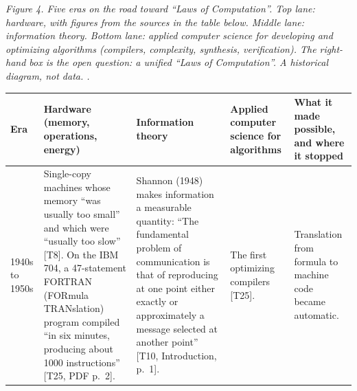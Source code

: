 \documentclass[10pt,letterpaper]{article}
\begin{document}
\emph{Figure 4. Five eras on the road toward ``Laws of Computation''.
Top lane: hardware, with figures from the sources in the table below.
Middle lane: information theory. Bottom lane: applied computer science
for developing and optimizing algorithms (compilers, complexity,
synthesis, verification). The right-hand box is the open question: a
unified ``Laws of Computation''. A historical diagram, not data. .}

{\footnotesize\setlength{\tabcolsep}{3.8pt}\renewcommand{\arraystretch}{1.15}
\begin{longtable}[]{@{}
  >{\raggedright\arraybackslash}p{}
  >{\raggedright\arraybackslash}p{}
  >{\raggedright\arraybackslash}p{}
  >{\raggedright\arraybackslash}p{}
  >{\raggedright\arraybackslash}p{}@{}}
\toprule\noalign{}
\begin{minipage}[b]{\linewidth}\raggedright
\textbf{Era}
\end{minipage} & \begin{minipage}[b]{\linewidth}\raggedright
\textbf{Hardware (memory, operations, energy)}
\end{minipage} & \begin{minipage}[b]{\linewidth}\raggedright
\textbf{Information theory}
\end{minipage} & \begin{minipage}[b]{\linewidth}\raggedright
\textbf{Applied computer science for algorithms}
\end{minipage} & \begin{minipage}[b]{\linewidth}\raggedright
\textbf{What it made possible, and where it stopped}
\end{minipage} \\
\midrule\noalign{}
\endhead
\bottomrule\noalign{}
\endlastfoot
1940s to 1950s & Single-copy machines whose memory ``was usually too
small'' and which were ``usually too slow'' {[}T8{]}. On the IBM 704, a
47-statement FORTRAN (FORmula TRANslation) program compiled ``in six
minutes, producing about 1000 instructions'' {[}T25, PDF p.~2{]}. &
Shannon (1948) makes information a measurable quantity: ``The
fundamental problem of communication is that of reproducing at one point
either exactly or approximately a message selected at another point''
{[}T10, Introduction, p.~1{]}. & The first optimizing compilers
{[}T25{]}. & Translation from formula to machine code became automatic.

\end{longtable}}
\end{document}
